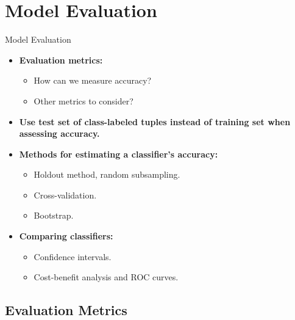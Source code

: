 \section{Model Evaluation}\label{section:evaluation}

\begin{frame}{Model Evaluation}
	\begin{itemize}
		\item \textbf{Evaluation metrics:}
		      \begin{itemize}
			      \item How can we measure accuracy?
			      \item Other metrics to consider?
		      \end{itemize}
		\item \textbf{Use {\color{airforceblue}test} set of class-labeled tuples instead of training set when assessing accuracy.}
		\item \textbf{Methods for estimating a classifier's accuracy:}
		      \begin{itemize}
			      \item Holdout method, random subsampling.
			      \item Cross-validation.
			      \item Bootstrap.
		      \end{itemize}
		\item \textbf{Comparing classifiers:}
		      \begin{itemize}
			      \item Confidence intervals.
			      \item Cost-benefit analysis and ROC curves.
		      \end{itemize}
	\end{itemize}
\end{frame}

\subsection{Evaluation Metrics}

